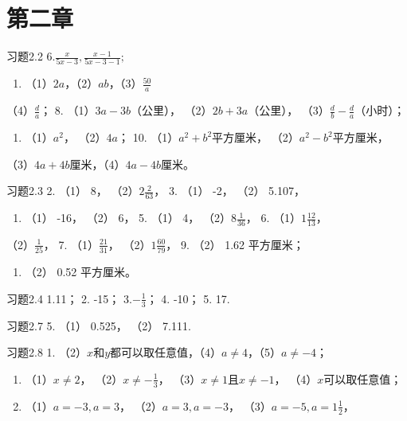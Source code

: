 \section{第二章}

习题2.2 6.\(\frac{x}{5x - 3},\frac{x - 1}{5x - 3 - 1};\)
\begin{enumerate}[start=7]
\item
  （1）\(2a\)，（2）\(ab\)，（3）\(\frac{50}{a}\)
\end{enumerate}

（4）\(\frac{d}{a}\)； 8. （1）\(3a - 3b\)（公里），
（2）\(2b + 3a\)（公里）， （3）\(\frac{d}{b} - \frac{d}{a}\)（小时）；

\begin{enumerate}[start=9]
\item
  （1）\(a^2\)， （2）\(4a\)； 10. （1）\(a^2 + b^2\)平方厘米，
  （2）\(a^2 - b^2\)平方厘米，
\end{enumerate}

（3）\(4a + 4b\)厘米，（4）\(4a - 4b\)厘米。

习题2.3 2. （1） 8， （2）\(2\frac{2}{63}\)， 3. （1） -2， （2）
5.107，

\begin{enumerate}[start=4]
\item
  （1） -16， （2） 6， 5. （1） 4， （2）\(8\frac{1}{36}\)， 6.
  （1）\(1\frac{12}{13}\)，
\end{enumerate}

（2）\(\frac{1}{25}\)， 7. （1）\(\frac{21}{31}\)，
（2）\(1\frac{60}{79}\)， 9. （2） 1.62 平方厘米；

\begin{enumerate}[start=10]
\item
  （2） 0.52 平方厘米。
\end{enumerate}

习题2.4 1.11； 2. -15； 3.\(-\frac{1}{3}\)； 4. -10； 5. 17.

习题2.7 5. （1） 0.525， （2） 7.111.

习题2.8 1.
（2）\(x\)和\(y\)都可以取任意值，（4）\(a \neq 4\)，（5）\(a \neq -4\)；

\begin{enumerate}[start=2]
\item
  （1）\(x \neq 2\)， （2）\(x \neq -\frac{1}{3}\)，
  （3）\(x \neq 1\)且\(x \neq -1\)， （4）\(x\)可以取任意值；
\item
  （1）\(a = -3, a = 3\)， （2）\(a = 3, a = -3\)，
  （3）\(a = -5, a = 1\frac{1}{2}\)，
\end{enumerate}

